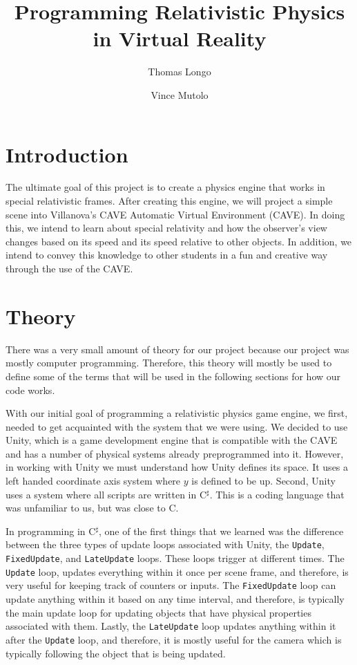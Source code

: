 \documentclass[12pt]{article}
\def\cpp{{C\nolinebreak[4]\hspace{-.05em}\raisebox{.1em}{\small\bf ++}}}
\newcommand{\csharp}{C$^\sharp$}
\begin{document}
\title{Programming Relativistic Physics in Virtual Reality}
\author{Thomas Longo \and Vince Mutolo}
\maketitle

\section{Introduction}
The ultimate goal of this project is to create a physics engine that works in special relativistic frames. After creating this engine, we will project a simple scene into Villanova's CAVE Automatic Virtual Environment (CAVE). In doing this, we intend to learn about special relativity and how the observer's view changes based on its speed and its speed relative to other objects. In addition, we intend to convey this knowledge to other students in a fun and creative way through the use of the CAVE.

\section{Theory}
There was a very small amount of theory for our project because our project was mostly computer programming. Therefore, this theory will mostly be used to define some of the terms that will be used in the following sections for how our code works.

With our initial goal of programming a relativistic physics game engine, we first, needed to get acquainted with the system that we were using. We decided to use Unity, which is a game development engine that is compatible with the CAVE and has a number of physical systems already preprogrammed into it. However, in working with Unity we must understand how Unity defines its space. It uses a left handed coordinate axis system where $y$ is defined to be up. Second, Unity uses a system where all scripts are written in \csharp{}. This is a coding language that was unfamiliar to us, but was close to \cpp{}. 

In programming in \csharp{}, one of the first things that we learned was the difference between the three types of update loops associated with Unity, the \texttt{Update}, \texttt{FixedUpdate}, and \texttt{LateUpdate} loops. These loops trigger at different times. The \texttt{Update} loop, updates everything within it once per scene frame, and therefore, is very useful for keeping track of counters or inputs. The \texttt{FixedUpdate} loop can update anything within it based on any time interval, and therefore, is typically the main update loop for updating objects that have physical properties associated with them. Lastly, the \texttt{LateUpdate} loop updates anything within it after the \texttt{Update} loop, and therefore, it is mostly useful for the camera which is typically following the object that is being updated.
\end{document}
